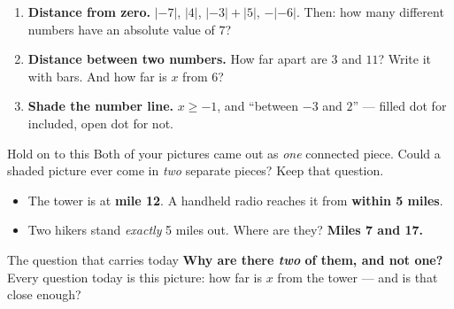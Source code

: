 \documentclass[aspectratio=169, 11pt]{beamer}
\newcommand{\trail}{%
  \draw[->, thick, charcoal] (-0.7,0)--(21.2,0) node[right, font=\tiny]{mile};
  \foreach \x in {0,...,20}{\draw[charcoal] (\x,0.22)--(\x,-0.22);}
  \foreach \x in {0,4,...,20}{\node[below, font=\tiny, charcoal] at (\x,-0.26){$\x$};}
  \fill[forest] (12,0) circle (3pt);
  \node[forest, font=\tiny, above] at (12,0.30){tower};}
\begin{document}
\begin{frame}[t, plain]
  \begin{enumerate}\setlength{\itemsep}{7pt}
    \item \textbf{Distance from zero.} $|{-7}|$, \; $|4|$, \; $|{-3}|+|5|$, \; $-|{-6}|$.
          Then: how many different numbers have an absolute value of $7$?
    \item \textbf{Distance between two numbers.} How far apart are $3$ and $11$? Write it with
          bars. And how far is $x$ from $6$?
    \item \textbf{Shade the number line.} $x \ge -1$, and ``between $-3$ and $2$'' --- filled dot
          for included, open dot for not.
  \end{enumerate}
  \vspace{6pt}
  \begin{block}{Hold on to this}
    Both of your pictures came out as \emph{one} connected piece. Could a shaded picture ever come
    in \emph{two} separate pieces? Keep that question.
  \end{block}
\end{frame}

\begin{frame}[t, plain]
  \begin{center}
  \end{center}
  \begin{itemize}\setlength{\itemsep}{4pt}
    \item The tower is at \textbf{mile 12}. A handheld radio reaches it from \textbf{within 5 miles}.
    \item Two hikers stand \emph{exactly} 5 miles out. Where are they? \; \textbf{Miles 7 and 17.}
  \end{itemize}
  \vspace{4pt}
  \begin{block}{The question that carries today}
    \textbf{Why are there \emph{two} of them, and not one?} Every question today is this picture:
    how far is $x$ from the tower --- and is that close enough?
  \end{block}
\end{frame}
\end{document}
